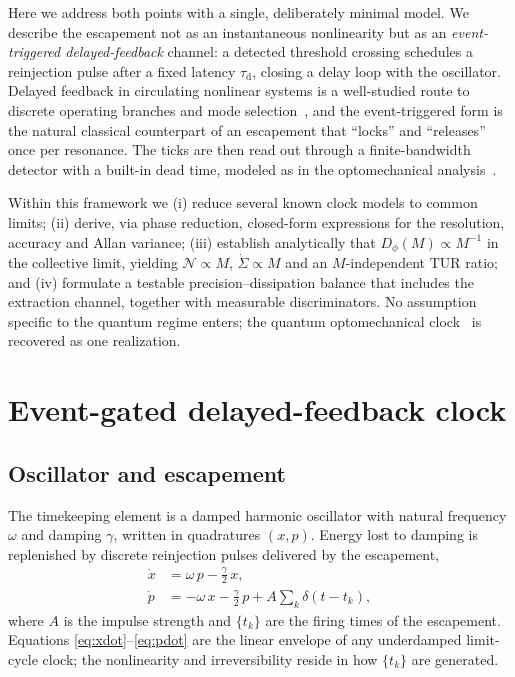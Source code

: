 \documentclass[aps,pre,reprint,amsmath,amssymb,floatfix,nofootinbib]{revtex4-2}
\newcommand{\Sdot}{\dot{\Sigma}}
\newcommand{\Dphi}{D_{\phi}}
\newcommand{\taud}{\tau_{\mathrm{d}}}
\begin{document}
Here we address both points with a single, deliberately minimal model.
We describe the escapement not as an instantaneous nonlinearity but as an
\emph{event-triggered delayed-feedback} channel: a detected threshold
crossing schedules a reinjection pulse after a fixed latency $\taud$,
closing a delay loop with the oscillator. Delayed feedback in
circulating nonlinear systems is a well-studied route to discrete
operating branches and mode selection~\cite{GiacomelliPoliti1996,YanchukGiacomelli2017},
and the event-triggered form is the natural classical counterpart of an
escapement that ``locks'' and ``releases'' once per resonance. The
ticks are then read out through a finite-bandwidth detector with a
built-in dead time, modeled as in the optomechanical
analysis~\cite{Brunelli2026,WisemanMilburn2009}.

Within this framework we (i) reduce several known clock models to common
limits; (ii) derive, via phase reduction, closed-form expressions for
the resolution, accuracy and Allan variance; (iii) establish analytically
that $\Dphi(M)\propto M^{-1}$ in the collective limit, yielding
$\mathcal{N}\propto M$, $\Sdot\propto M$ and an $M$-independent TUR
ratio; and (iv) formulate a testable precision--dissipation balance that
includes the extraction channel, together with measurable
discriminators. No assumption specific to the quantum regime enters; the
quantum optomechanical clock~\cite{Brunelli2026} is recovered as one
realization.

\section{Event-gated delayed-feedback clock}
\label{sec:model}

\subsection{Oscillator and escapement}

The timekeeping element is a damped harmonic oscillator with natural
frequency $\omega$ and damping $\gamma$, written in quadratures
$(x,p)$. Energy lost to damping is replenished by discrete reinjection
pulses delivered by the escapement,
\begin{align}
  \dot{x} &= \omega\,p - \tfrac{\gamma}{2}\,x , \label{eq:xdot}\\
  \dot{p} &= -\omega\,x - \tfrac{\gamma}{2}\,p
            + A\sum_{k} \delta\!\left(t-t_k\right) , \label{eq:pdot}
\end{align}
where $A$ is the impulse strength and $\{t_k\}$ are the firing times of
the escapement. Equations \eqref{eq:xdot}--\eqref{eq:pdot} are the
linear envelope of any underdamped limit-cycle clock; the nonlinearity
and irreversibility reside in how $\{t_k\}$ are generated.
\end{document}

